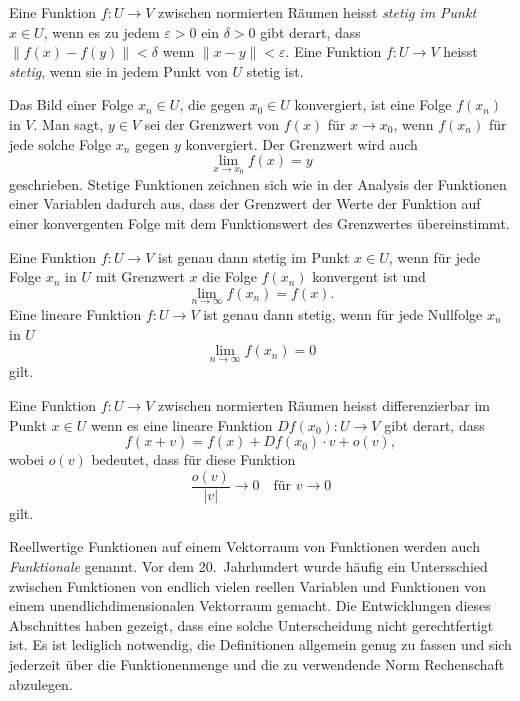\begin{definition}[Stetigkeit]
Eine Funktion $f\colon U\to V$ zwischen normierten Räumen heisst
{\em stetig im Punkt} $x\in U$, wenn es zu jedem $\varepsilon > 0$
%
ein $\delta > 0$
gibt derart, dass
\(
\|f(x)-f(y)\| < \delta
\)
wenn
\(
\|x-y\|<\varepsilon
\).
Eine Funktion $f\colon U\to V$ heisst {\em stetig}, wenn sie in
jedem Punkt von $U$ stetig ist.
%
\end{definition}

Das Bild einer Folge $x_n\in U$, die gegen $x_0\in U$ konvergiert,
ist eine Folge $f(x_n)$ in $V$.
Man sagt, $y\in V$ sei der Grenzwert von $f(x)$ für $x\to x_0$,
wenn $f(x_n)$ für jede solche Folge $x_n$ gegen $y$ konvergiert.
Der Grenzwert wird auch
\[
\lim_{x\to x_0} f(x)
=
y
\]
geschrieben.
Stetige Funktionen zeichnen sich wie in der Analysis der Funktionen
einer Variablen dadurch aus, dass der Grenzwert der Werte der Funktion
auf einer konvergenten Folge mit dem Funktionswert des Grenzwertes
übereinstimmt.

\begin{satz}
Eine Funktion $f\colon U\to V$ ist genau dann stetig im Punkt $x\in U$,
wenn für jede Folge $x_n$ in $U$ mit Grenzwert $x$ die Folge $f(x_n)$
konvergent ist und
\[
\lim_{n\to\infty} f(x_n) = f(x).
\]
Eine lineare Funktion $f\colon U\to V$ ist genau dann stetig,
wenn für jede Nullfolge $x_n$ in $U$ 
\[
\lim_{n\to \infty} f(x_n) = 0
\]
gilt.
\end{satz}

\begin{definition}
Eine Funktion $f\colon U\to V$ zwischen normierten Räumen heisst
differenzierbar im Punkt $x\in U$ wenn es eine lineare Funktion
$Df(x_0)\colon U\to V$ gibt derart, dass
\[
f(x+v) =f(x) + Df(x_0)\cdot v + o(v),
\]
wobei $o(v)$ bedeutet, dass für diese Funktion
\[
\frac{o(v)}{|v|}\to 0
\quad\text{für $v\to 0$}
\]
gilt.
\end{definition}

Reellwertige Funktionen auf einem Vektorraum von Funktionen
werden auch {\em Funktionale} genannt.
%
Vor dem 20.~Jahrhundert wurde häufig ein Untersschied zwischen
Funktionen von endlich vielen reellen Variablen und Funktionen
von einem unendlichdimensionalen Vektorraum gemacht.
Die Entwicklungen dieses  Abschnittes haben gezeigt, dass eine
solche Unterscheidung nicht gerechtfertigt ist.
Es ist lediglich notwendig, die Definitionen allgemein genug zu
fassen und sich jederzeit über die Funktionenmenge und die zu
verwendende Norm Rechenschaft abzulegen.

